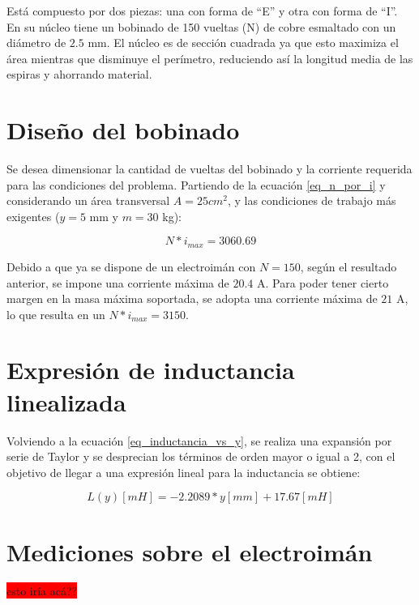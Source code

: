  Está compuesto por dos piezas: una con forma de “E” y otra con forma de “I”. En su núcleo tiene un bobinado de 150 vueltas (N) de cobre esmaltado con un diámetro de $2.5$ mm. El núcleo es de sección cuadrada ya que esto maximiza el área mientras que disminuye el perímetro, reduciendo así la longitud media de las espiras y ahorrando material. 


\section{Diseño del bobinado}

\noindent Se desea dimensionar la cantidad de vueltas del bobinado y la corriente requerida para las condiciones del problema. Partiendo de la ecuación \ref{eq_n_por_i} y considerando un área transversal $A=25 cm^{2}$, y las condiciones de trabajo más exigentes ($y=5$ mm y $m=30$ kg):

\begin{equation}
	N*i_{max}=3060.69 
\end{equation}

\noindent Debido a que ya se dispone de un electroimán con $N=150$, según el resultado anterior, se impone una corriente máxima de $20.4$ A. Para poder tener cierto margen en la masa máxima soportada, se adopta una corriente máxima de $21$ A, lo que resulta en un $N*i_{max}=3150$.



\section{Expresión de inductancia linealizada}

\noindent Volviendo a la ecuación \ref{eq_inductancia_vs_y}, se realiza una expansión por serie de Taylor y se desprecian los términos de orden mayor o igual a 2, con el objetivo de llegar a una expresión lineal para la inductancia se obtiene:

\begin{equation} \label{eq_inductancia_lineal_teorica}
	L(y)[mH]=-2.2089*y[mm]+17.67 [mH]
\end{equation}

\section{Mediciones sobre el electroimán}

\colorbox{red}{esto iría acá??}

